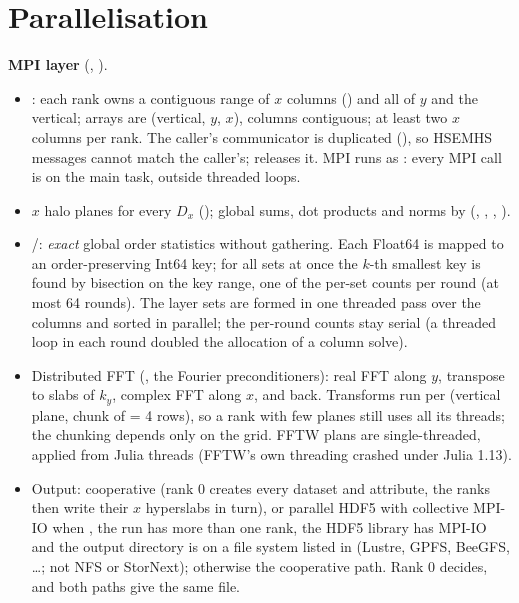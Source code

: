 \section{Parallelisation}\label{sec:parallel}
\textbf{MPI layer} (, ).
\begin{itemize}
\item {}: each rank owns a contiguous range of $x$ columns () and all of
$y$ and the vertical; arrays are (vertical, $y$, $x$), columns contiguous; at least two $x$ columns per rank. The caller's
communicator is duplicated (), so HSEMHS messages cannot match the caller's;  releases it.
MPI runs as : every MPI call is on the main task, outside threaded loops.
\item $x$ halo planes for every $D_x$ (); global sums, dot products and norms by 
(, , , ).
\item {}/: \emph{exact} global order statistics without gathering. Each Float64 is mapped to an
order-preserving Int64 key; for all sets at once the $k$-th smallest key is found by bisection on the key range, one
 of the per-set counts per round (at most 64 rounds). The layer sets are formed in one threaded pass over the
columns and sorted in parallel; the per-round counts stay serial (a threaded loop in each round doubled the allocation of a
column solve).
\item Distributed FFT (, the Fourier preconditioners): real FFT along $y$,  transpose to slabs of
$k_y$, complex FFT along $x$, and back. Transforms run per (vertical plane, chunk of  = 4 rows), so a rank with
few planes still uses all its threads; the chunking depends only on the grid. FFTW plans are single-threaded, applied from Julia
threads (FFTW's own threading crashed under Julia 1.13).
\item Output: cooperative (rank 0 creates every dataset and attribute, the ranks then write their $x$ hyperslabs in turn), or
parallel HDF5 with collective MPI-IO when , the run has more than one rank, the HDF5
library has MPI-IO and the output directory is on a file system listed in  (Lustre, GPFS, BeeGFS,
\dots; not NFS or StorNext); otherwise the cooperative path. Rank 0 decides, and both paths give the same file.
\end{itemize}

